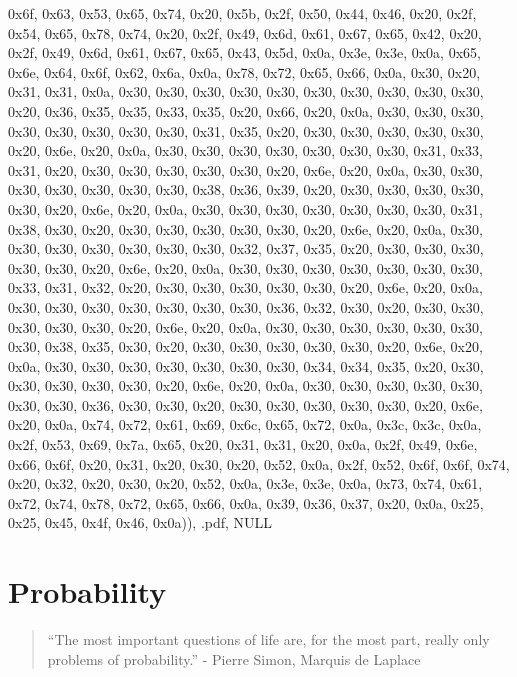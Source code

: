 \documentclass[
]{book}
\theoremstyle{definition}
\theoremstyle{definition}
\theoremstyle{definition}
\theoremstyle{remark}
\begin{document}
0x6f, 0x63, 0x53, 0x65, 0x74, 0x20, 0x5b, 0x2f, 0x50, 0x44, 0x46, 0x20, 0x2f, 0x54, 0x65, 0x78, 0x74, 0x20, 0x2f, 0x49, 0x6d, 0x61, 0x67, 0x65, 0x42, 0x20, 0x2f, 0x49, 0x6d, 0x61, 0x67, 0x65, 0x43, 0x5d, 0x0a, 0x3e, 0x3e, 0x0a, 0x65, 0x6e, 0x64, 0x6f, 0x62, 0x6a, 0x0a, 0x78, 0x72, 0x65, 0x66, 0x0a, 0x30, 0x20, 0x31, 0x31, 0x0a, 0x30, 0x30, 0x30, 0x30, 0x30, 0x30, 0x30, 0x30, 0x30, 0x30, 0x20, 0x36, 0x35, 0x35, 0x33, 0x35, 0x20, 0x66, 0x20, 0x0a, 0x30, 0x30, 0x30, 0x30, 0x30, 0x30, 0x30, 0x30, 0x31,
0x35, 0x20, 0x30, 0x30, 0x30, 0x30, 0x30, 0x20, 0x6e, 0x20, 0x0a, 0x30, 0x30, 0x30, 0x30, 0x30, 0x30, 0x30, 0x31, 0x33, 0x31, 0x20, 0x30, 0x30, 0x30, 0x30, 0x30, 0x20, 0x6e, 0x20, 0x0a, 0x30, 0x30, 0x30, 0x30, 0x30, 0x30, 0x30, 0x38, 0x36, 0x39, 0x20, 0x30, 0x30, 0x30, 0x30, 0x30, 0x20, 0x6e, 0x20, 0x0a, 0x30, 0x30, 0x30, 0x30, 0x30, 0x30, 0x30, 0x31, 0x38, 0x30, 0x20, 0x30, 0x30, 0x30, 0x30, 0x30, 0x20, 0x6e, 0x20, 0x0a, 0x30, 0x30, 0x30, 0x30, 0x30, 0x30, 0x30, 0x32, 0x37, 0x35, 0x20, 0x30, 0x30,
0x30, 0x30, 0x30, 0x20, 0x6e, 0x20, 0x0a, 0x30, 0x30, 0x30, 0x30, 0x30, 0x30, 0x30, 0x33, 0x31, 0x32, 0x20, 0x30, 0x30, 0x30, 0x30, 0x30, 0x20, 0x6e, 0x20, 0x0a, 0x30, 0x30, 0x30, 0x30, 0x30, 0x30, 0x30, 0x36, 0x32, 0x30, 0x20, 0x30, 0x30, 0x30, 0x30, 0x30, 0x20, 0x6e, 0x20, 0x0a, 0x30, 0x30, 0x30, 0x30, 0x30, 0x30, 0x30, 0x38, 0x35, 0x30, 0x20, 0x30, 0x30, 0x30, 0x30, 0x30, 0x20, 0x6e, 0x20, 0x0a, 0x30, 0x30, 0x30, 0x30, 0x30, 0x30, 0x30, 0x34, 0x34, 0x35, 0x20, 0x30, 0x30, 0x30, 0x30, 0x30, 0x20,
0x6e, 0x20, 0x0a, 0x30, 0x30, 0x30, 0x30, 0x30, 0x30, 0x30, 0x36, 0x30, 0x30, 0x20, 0x30, 0x30, 0x30, 0x30, 0x30, 0x20, 0x6e, 0x20, 0x0a, 0x74, 0x72, 0x61, 0x69, 0x6c, 0x65, 0x72, 0x0a, 0x3c, 0x3c, 0x0a, 0x2f, 0x53, 0x69, 0x7a, 0x65, 0x20, 0x31, 0x31, 0x20, 0x0a, 0x2f, 0x49, 0x6e, 0x66, 0x6f, 0x20, 0x31, 0x20, 0x30, 0x20, 0x52, 0x0a, 0x2f, 0x52, 0x6f, 0x6f, 0x74, 0x20, 0x32, 0x20, 0x30, 0x20, 0x52, 0x0a, 0x3e, 0x3e, 0x0a, 0x73, 0x74, 0x61, 0x72, 0x74, 0x78, 0x72, 0x65, 0x66, 0x0a, 0x39, 0x36, 0x37,
0x20, 0x0a, 0x25, 0x25, 0x45, 0x4f, 0x46, 0x0a)), .pdf, NULL

\hypertarget{ch4}{%
\chapter{Probability}\label{ch4}}

\begin{quote}
``The most important questions of life are, for the most part, really only problems of probability.'' - Pierre Simon, Marquis de Laplace
\end{quote}
\end{document}
